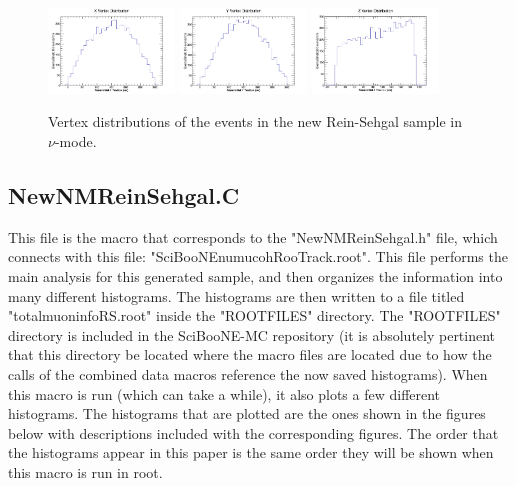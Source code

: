 \documentclass[11pt]{article}
\begin{document}
\begin{figure}[H]
\centering
\includegraphics[width=0.3\textwidth]{NewNMReinSehgalImages/4-XVertexDistributionNMRS.png}
\includegraphics[width=0.3\textwidth]{NewNMReinSehgalImages/3-YVertexDistributionNMRS.png}
\includegraphics[width=0.3\textwidth]{NewNMReinSehgalImages/2-ZVertexDistributionNMRS.png}
\caption{Vertex distributions of the events in the new Rein-Sehgal sample in $\nu$-mode.}
\end{figure}





\subsection{NewNMReinSehgal.C}
This file is the macro that corresponds to the "NewNMReinSehgal.h" file, which connects with this file: "SciBooNE\textunderscore numu\textunderscore coh\textunderscore RooTrack.root". This file performs the main analysis for this generated sample, and then organizes the information into many different histograms. The histograms are then written to a file titled "totalmuoninfoRS.root" inside the "ROOTFILES" directory. The "ROOTFILES" directory is included in the SciBooNE-MC repository (it is absolutely pertinent that this directory be located where the macro files are located due to how the calls of the combined data macros reference the now saved histograms). When this macro is run (which can take a while), it also plots a few different histograms. The histograms that are plotted are the ones shown in the figures below with descriptions included with the corresponding figures. The order that the histograms appear in this paper is the same order they will be shown when this macro is run in root.
\end{document}

